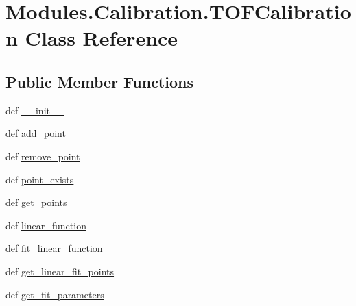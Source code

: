 \hypertarget{classModules_1_1Calibration_1_1TOFCalibration}{\section{Modules.\-Calibration.\-T\-O\-F\-Calibration Class Reference}
\label{classModules_1_1Calibration_1_1TOFCalibration}
}
\subsection*{Public Member Functions}
\begin{DoxyCompactItemize}
\item 
def \hyperlink{classModules_1_1Calibration_1_1TOFCalibration_aa746fa9385c7797a007f6395f1c37f42}{\-\_\-\-\_\-init\-\_\-\-\_\-}
\item 
def \hyperlink{classModules_1_1Calibration_1_1TOFCalibration_af0a72b3f5114d90042a447e0bee50ac4}{add\-\_\-point}
\item 
def \hyperlink{classModules_1_1Calibration_1_1TOFCalibration_a4edeec924fa161898b4d21ac0a0fff77}{remove\-\_\-point}
\item 
def \hyperlink{classModules_1_1Calibration_1_1TOFCalibration_afe201dcbbe0c0b21d3a9f72f4c0e67a7}{point\-\_\-exists}
\item 
def \hyperlink{classModules_1_1Calibration_1_1TOFCalibration_abdb4198c359571381301685a461def45}{get\-\_\-points}
\item 
def \hyperlink{classModules_1_1Calibration_1_1TOFCalibration_a5b16ed3d9a9d0b7f5fee2282ebc91ef0}{linear\-\_\-function}
\item 
def \hyperlink{classModules_1_1Calibration_1_1TOFCalibration_a2264a4fc7518303645c73dc61a0a0d8f}{fit\-\_\-linear\-\_\-function}
\item 
def \hyperlink{classModules_1_1Calibration_1_1TOFCalibration_a024fd5a5363050e5ec5383eb7c2c4065}{get\-\_\-linear\-\_\-fit\-\_\-points}
\item 
def \hyperlink{classModules_1_1Calibration_1_1TOFCalibration_af6d44adf09edc3ccc068a2f389ccae5c}{get\-\_\-fit\-\_\-parameters}
\end{DoxyCompactItemize}
